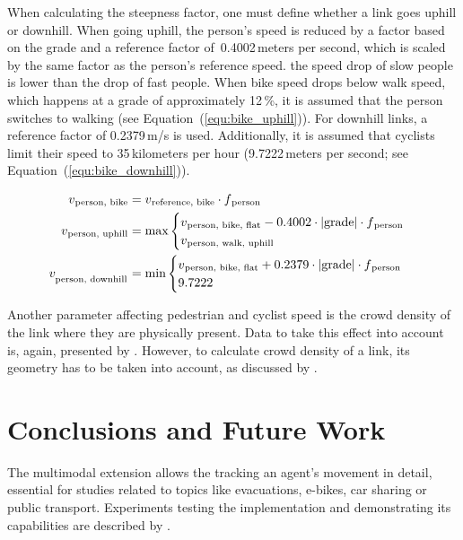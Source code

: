When calculating the steepness factor, one must define whether a link goes uphill or downhill. When going uphill, the person's speed is reduced by a factor based on the grade and a reference factor of~0.4002\,meters per second, which is scaled by the same factor as the person's reference speed. \ie the speed drop of slow people is lower than the drop of fast people. When bike speed drops below walk speed, which happens at a grade of approximately 12\,\%, it is assumed that the person switches to walking (see Equation~(\ref{equ:bike_uphill})). For downhill links, a reference factor of 0.2379\,m/s is used. Additionally, it is assumed that cyclists limit their speed to 35\,kilometers per hour (9.7222\,meters per second; see Equation~(\ref{equ:bike_downhill})).

{\fontsize{12.8pt}{12}
\begin{align}
    v\textsubscript{person, bike} &= v\textsubscript{reference, bike} \cdot f\textsubscript{person}\\
    v\textsubscript{person, uphill} &= \text{max}
    \begin{cases}
        v\textsubscript{person, bike, flat} - 0.4002 \cdot |\text{grade}| \cdot f\textsubscript{person}\\
        v\textsubscript{person, walk, uphill}
    \end{cases}\label{equ:bike_uphill}\\
    v_{\textsubscript{person, downhill}} &= \text{min}
    \begin{cases}
        v\textsubscript{person, bike, flat} + 0.2379 \cdot |\text{grade}| \cdot f\textsubscript{person}\\
        9.7222
    \end{cases}\label{equ:bike_downhill}
\end{align}
}%

Another parameter affecting pedestrian and cyclist speed is the crowd density of the link where they are physically present. Data to take this effect into account is, again, presented by \citet{Weidmann_TechRep_IVT_1992}. However, to calculate crowd density of a link, its geometry has to be taken into account, as discussed by \citet{Laemmel_PhDThesis_2011}. 

\section{Conclusions and Future Work}
The \gls{multimodal} \gls{extension} allows the tracking an agent's movement in detail, essential for studies related to topics like evacuations, e-bikes, car sharing or public transport. Experiments testing the implementation and demonstrating its capabilities are described by \citet{Dobler_PhDThesis_2013}.

